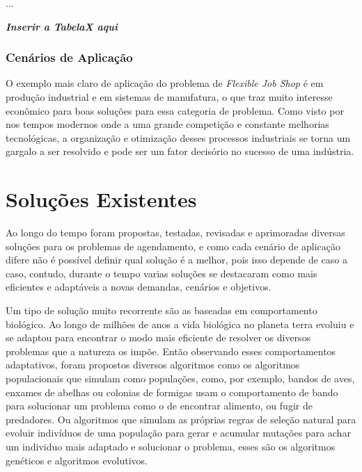             ...\newline

            \textit{\textbf{Inserir a TabelaX aqui}}\newline


        \subsubsection{Cenários de Aplicação}
            O exemplo mais claro de aplicação do problema de \textit{Flexible Job Shop} é em produção industrial e em sistemas de manufatura, o que traz muito interesse econômico para boas soluções para essa categoria de problema.\newline
            Como visto por \cite{Wari2016} nos tempos modernos onde a uma grande competição e constante melhorias tecnológicas, a organização e otimização desses processos industriais se torna um gargalo a ser resolvido e pode ser um fator decisório no sucesso de uma indústria.
        
    


\section{Soluções Existentes}
        Ao longo do tempo foram propostas, testadas, revisadas e aprimoradas diversas soluções para os problemas de agendamento, e como cada cenário de aplicação difere não é possível definir qual solução é a melhor, pois isso depende de caso a caso, contudo, durante o tempo varias soluções se destacaram como mais eficientes e adaptáveis a novas demandas, cenários e objetivos. \newline
        
        Um tipo de solução muito recorrente são as baseadas em comportamento biológico. Ao longo de milhões de anos a vida biológica no planeta terra evoluiu e se adaptou para encontrar o modo mais eficiente de resolver os diversos problemas que a natureza os impõe. Então observando esses comportamentos adaptativos, foram propostos diversos algoritmos como os algoritmos populacionais que simulam como populações, como, por exemplo, bandos de aves, enxames de abelhas ou colonias de formigas usam o comportamento de bando para solucionar um problema como o de encontrar alimento, ou fugir de predadores. Ou algoritmos que simulam as próprias regras de seleção natural para evoluir indivíduos de uma população para gerar e acumular mutações para achar um individuo mais adaptado e solucionar o problema, esses são os algoritmos genéticos e algoritmos evolutivos.


